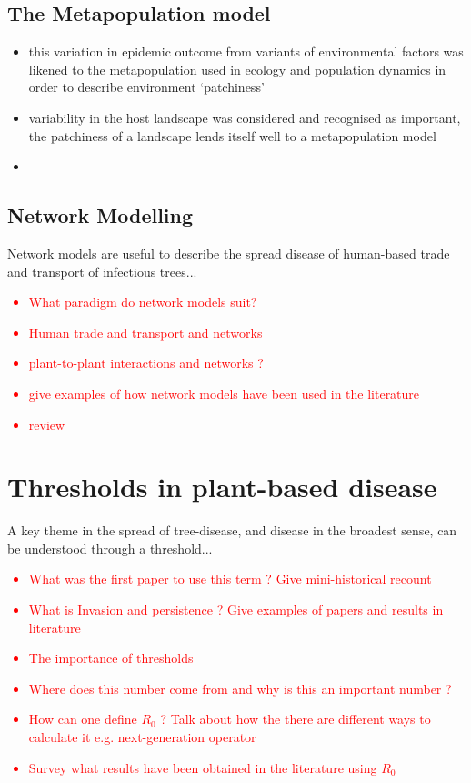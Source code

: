 \subsection{The Metapopulation model}
\begin{itemize}
    \item this variation in epidemic outcome from variants of environmental factors was likened to the metapopulation used in ecology and population dynamics in order to describe environment `patchiness'
    \item variability in the host landscape was considered and recognised as important, the patchiness of a landscape lends itself well to a metapopulation model
    \cite{doi:10.1098/rstb.1986.0072}
    \item \cite{large-scale-control}
\end{itemize}

\subsection{Network Modelling}

Network models are useful to describe the spread disease of human-based trade and transport of infectious trees...

\textcolor{red}{
\begin{itemize}
    \item What paradigm do network models suit?
    \item Human trade and transport and networks 
    \item plant-to-plant interactions and networks ? 
    \item give examples of how network models have been used in the literature
    \item review \cite{doi:10.1098/rsif.2005.0051}
\end{itemize}}

\section{Thresholds in plant-based disease}

A key theme in the spread of tree-disease, and disease in the broadest sense, can be understood through a threshold...
\textcolor{red}{
\begin{itemize}
    \item What was the first paper to use this term ? Give mini-historical recount
    \item What is Invasion and persistence ? Give examples of papers and results in literature 
    \item The importance of thresholds
    \item Where does this number come from and why is \textbf{}this an important number ?
    \item How can one define $R_0$ ? Talk about how the there are different ways to calculate it e.g. next-generation operator 
    \item Survey what results have been obtained in the literature using $R_0$
\end{itemize}}


